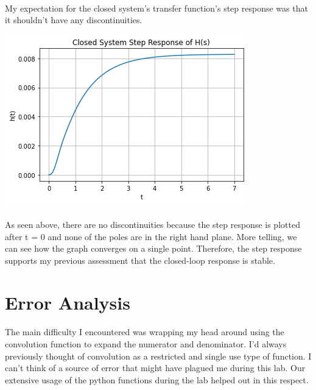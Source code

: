 \documentclass[12pt]{report}
\begin{document}
    \paragraph{} My expectation for the closed system's transfer function's step response was that it shouldn't have any discontinuities. 
    
    \includegraphics[scale=0.6]{closed.png}
    
    \paragraph{} As seen above, there are no discontinuities because the step response is plotted after t = 0 and none of the poles are in the right hand plane. More telling, we can see how the graph converges on a single point. Therefore, the step response supports my previous assessment that the closed-loop response is stable.   


\section{Error Analysis}


\paragraph{} The main difficulty I encountered was wrapping my head around using the convolution function to expand the numerator and denominator. I'd always previously thought of convolution as a restricted and single use type of function. I can't think of a source of error that might have plagued me during this lab. Our extensive usage of the python functions during the lab helped out in this respect. 
\end{document}
